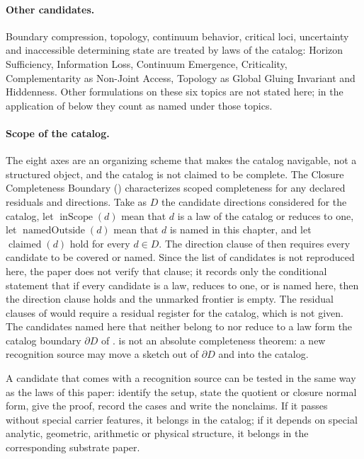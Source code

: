 \paragraph{Other candidates.}  Boundary compression, topology,
continuum behavior, critical loci, uncertainty and inaccessible
determining state are treated by laws of the catalog: Horizon Sufficiency, Information Loss, Continuum Emergence,
Criticality, Complementarity as Non-Joint Access, Topology as Global
Gluing Invariant and Hiddenness.  Other formulations on these six
topics are not stated here; in the application of  below
they count as named under those topics.

\paragraph{Scope of the catalog.}  The eight axes are an organizing
scheme that makes the catalog navigable, not a structured object, and
the catalog is not claimed to be complete.  The Closure Completeness
Boundary () characterizes scoped completeness for any
declared residuals and directions.  Take as \(D\) the candidate
directions considered for the catalog, let
\(\operatorname{inScope}(d)\) mean that \(d\) is a law of the catalog
or reduces to one, let \(\operatorname{namedOutside}(d)\) mean that
\(d\) is named in this chapter, and let \(\operatorname{claimed}(d)\)
hold for every \(d\in D\).  The direction clause of  then
requires every candidate to be covered or named.  Since the list of
candidates is not reproduced here, the paper does not verify that
clause; it records only the conditional statement that if every
candidate is a law, reduces to one, or is named here, then the direction
clause holds and the unmarked frontier is empty.  The residual clauses
of  would require a residual register for the catalog,
which is not given.  The candidates named here that neither belong to
nor reduce to a law form the catalog boundary \(\partial D\) of
.   is not an absolute
completeness theorem: a new recognition source may move a sketch out of
\(\partial D\) and into the catalog.

A candidate that comes with a recognition source can be tested in the
same way as the laws of this paper: identify the setup, state the
quotient or closure normal form, give the proof, record the cases and
write the nonclaims.  If it passes without special carrier features, it
belongs in the catalog; if it depends on special analytic, geometric,
arithmetic or physical structure, it belongs in the corresponding
substrate paper.
